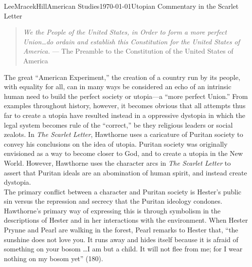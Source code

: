 \documentclass[12pt, letterpaper]{article}
\begin{document}
\begin{mla}{Lee}{Mracek}{Hill}{American Studies}{\today}{Utopian Commentary in the Scarlet Letter}
\begin{quotation}
\textit{We the People of the United States, in Order to form a more perfect Union\ldots do ordain and establish this Constitution for the United States of America.} --- The Preamble to the Constitution of the United States of America
\end{quotation}
The great ``American Experiment,'' the creation of a country run by its people, with equality for all, can in many ways be considered an echo of an intrinsic human need to build the perfect society or utopia---a ``more perfect Union.'' From examples throughout history, however, it becomes obvious that all attempts thus far to create a utopia have resulted instead in a oppressive dystopia in which the legal system becomes rule of the ``correct,'' be they religious leaders or social zealots. In \textit{The Scarlet Letter}, Hawthorne uses a caricature of Puritan society to convey his conclusions on the idea of utopia. Puritan society was originally envisioned as a way to become closer to God, and to create a utopia in the New World. However, Hawthorne uses the character arcs in \textit{The Scarlet Letter} to assert that Puritan ideals are an abomination of human spirit, and instead create dystopia. \\
        The primary conflict between a character and Puritan society is Hester's public sin versus the repression and secrecy that the Puritan ideology condones. Hawthorne's primary way of expressing this is through symbolism in the descriptions of Hester and in her interactions with the environment. When Hester Prynne and Pearl are walking in the forest, Pearl remarks to Hester that, ``the sunshine does not love you. It runs away and hides itself because it is afraid of something on your bosom \ldots I am but a child. It will not flee from me; for I wear nothing on my bosom yet'' (180).

\end{mla}
\end{document}
